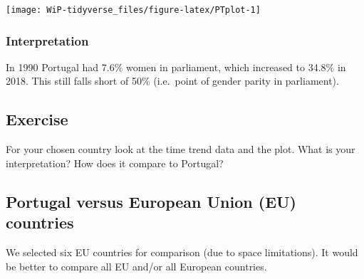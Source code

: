 \documentclass[a4paper,9pt,twocolumn,twoside,printwatermark=false]{pinp}
\begin{document}
\begin{center}\texttt{[image: WiP-tidyverse\_files/figure-latex/PTplot-1]} \end{center}

\subsubsection{Interpretation}\label{interpretation}

In 1990 Portugal had 7.6\% women in parliament, which increased to
34.8\% in 2018. This still falls short of 50\% (i.e.~point of gender
parity in parliament).

\subsection{Exercise}\label{exercise-4}

For your chosen country look at the time trend data and the plot. What
is your interpretation? How does it compare to Portugal?

\subsection{Portugal versus European Union (EU)
countries}\label{portugal-versus-european-union-eu-countries}

We selected six EU countries for comparison (due to space limitations).
It would be better to compare all EU and/or all European countries.

\begin{Shaded}
\end{Shaded}
\end{document}

